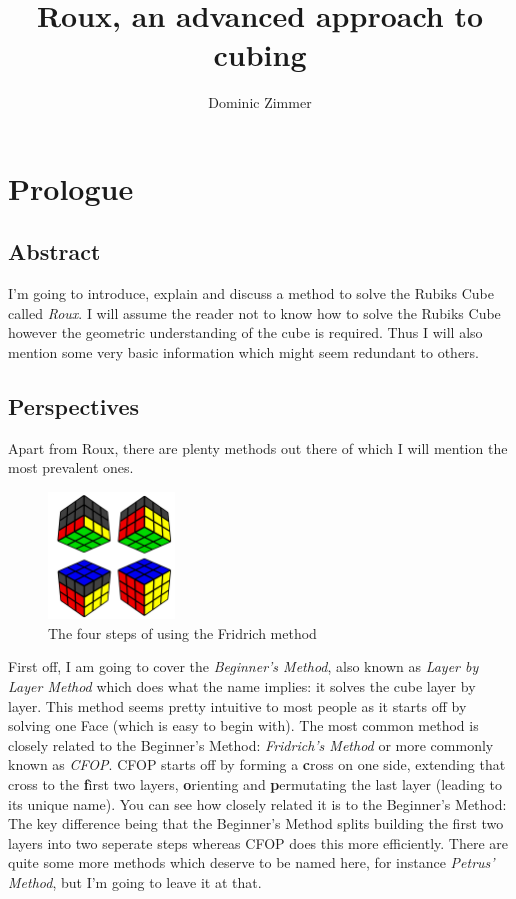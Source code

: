 \documentclass{scrreprt}
\begin{document}
\title{Roux, an advanced approach to cubing}
\author{Dominic Zimmer}
\maketitle 

\tableofcontents
\chapter{Prologue}

\section{Abstract}
I'm going to introduce, explain and discuss a method to solve the Rubiks Cube called \emph{Roux}. I will assume the reader not to know how to solve the Rubiks Cube however the geometric understanding of the cube is required. Thus I will also mention some very basic information which might seem redundant to others.

\section{Perspectives}
Apart from Roux, there are plenty methods out there of which I will mention the most prevalent ones.

\begin{figure}
\centering
\includegraphics[width=0.3\textwidth]{union.png}
\caption*{The four steps of using the Fridrich method}
\end{figure}
First off, I am going to cover the \emph{Beginner's Method}, also known as \emph{Layer by Layer Method} which does what the name implies: it solves the cube layer by layer. This method seems pretty intuitive to most people as it starts off by solving one Face (which is easy to begin with). The most common method is closely related to the Beginner's Method: \emph{Fridrich's Method} or more commonly known as \emph{CFOP}. CFOP starts off by forming a \textbf{c}ross on one side, extending that cross to the \textbf{f}irst two layers, \textbf{o}rienting and \textbf{p}ermutating the last layer (leading to its unique name). You can see how closely related it is to the Beginner's Method: The key difference being that the Beginner's Method splits building the first two layers into two seperate steps whereas CFOP does this more efficiently. There are quite some more methods which deserve to be named here, for instance \emph{Petrus' Method}, but I'm going to leave it at that.
\end{document}
